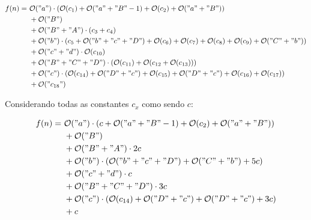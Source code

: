 \documentclass{article}
\begin{document}
\begin{align}
  \begin{split}
    f(n) =\ &{} \mathcal{O}("a") \cdot (\mathcal{O}(c_1) + \mathcal{O}("a" + "B" - 1) + \mathcal{O}(c_2) + \mathcal{O}("a" + "B") ) \\
            & +\mathcal{O}("B") \\
            & +\mathcal{O}("B" + "A") \cdot (c_3 + c_4) \\
            & +\mathcal{O}("b") \cdot (c_5 + \mathcal{O}("b" + "c" + "D") + \mathcal{O}(c_6) + \mathcal{O}(c_7) + \mathcal{O}(c_8) + \mathcal{O}(c_9) + \mathcal{O}("C" + "b"))  \\
            & +\mathcal{O}("c" + "d") \cdot \mathcal{O}(c_{10}) \\
            & +\mathcal{O}("B" + "C" + "D") \cdot (\mathcal{O}(c_{11}) + \mathcal{O}(c_{12} + \mathcal{O}(c_{13}))) \\
            & +\mathcal{O}("c") \cdot (\mathcal{O}(c_{14}) + \mathcal{O}("D" + "c") + \mathcal{O}(c_{15}) + \mathcal{O}("D" + "c") + \mathcal{O}(c_{16}) + \mathcal{O}(c_{17})) \\
            & +\mathcal{O}("c_{18}") \\
\end{split}
\end{align}

Considerando todas as constantes $c_x$ como sendo $c$:

\begin{align}
  \begin{split}
    f(n) =\ &{} \mathcal{O}("a") \cdot (c + \mathcal{O}("a" + "B" - 1) + \mathcal{O}(c_2) + \mathcal{O}("a" + "B") ) \\
            & +\mathcal{O}("B") \\
            & +\mathcal{O}("B" + "A") \cdot 2c \\
            & +\mathcal{O}("b") \cdot (\mathcal{O}("b" + "c" + "D") + \mathcal{O}("C" + "b") + 5c)  \\
            & +\mathcal{O}("c" + "d") \cdot c \\
            & +\mathcal{O}("B" + "C" + "D") \cdot 3c \\
            & +\mathcal{O}("c") \cdot (\mathcal{O}(c_{14}) + \mathcal{O}("D" + "c") + \mathcal{O}("D" + "c") + 3c ) \\
            & +c \\
\end{split}
\end{align}
\end{document}
